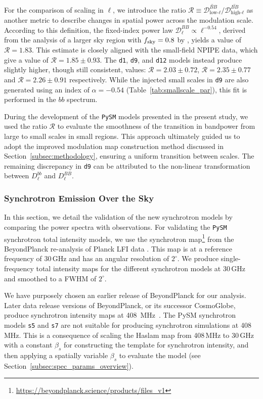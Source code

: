 \documentclass[twocolumn]{aastex631}
\begin{document}
For the comparison of scaling in $\ell$, we introduce the ratio $\mathcal{R} \equiv \overline{\mathcal{D}_{\text{low-}\ell}^{BB}} \Big/ \overline{\mathcal{D}_{\text{high-}\ell}^{BB}}$ as another metric to describe changes in spatial power across the modulation scale. According to this definition, the fixed-index power law $\mathcal{D}_\ell^{BB} \propto \ell^{-0.54}$, derived from the analysis of a larger sky region with $f_{\rm sky} = 0.8$ by \cite{planck2016-l11A}, yields a value of $\mathcal{R} = 1.83$. This estimate is closely aligned with the small-field NPIPE data, which give a value of $\mathcal{R} = 1.85 \pm 0.93$. The \texttt{d1}, \texttt{d9}, and \texttt{d12} models instead produce slightly higher, though still consistent, values: $\mathcal{R} = 2.03 \pm 0.72$, $\mathcal{R} = 2.35 \pm 0.77$ and $\mathcal{R} = 2.26 \pm 0.91$ respectively. While the injected small scales in \texttt{d9} are also generated using an index of $\alpha = -0.54$ (Table~\ref{tab:smallscale_par}), this fit is performed in the $bb$ spectrum. 

During the development of the \texttt{PySM} models presented in the present study, we used the ratio $\mathcal{R}$ to evaluate the smoothness of the transition in bandpower from large to small scales in small regions. This approach ultimately guided us to adopt the improved modulation map construction method discussed in Section~\ref{subsec:methodology}, ensuring a uniform transition between scales. The remaining discrepancy in \texttt{d9} can be attributed to the non-linear transformation between $D_\ell^{bb}$ and $D_\ell^{BB}$.

\subsubsection{Synchrotron Emission Over the Sky} \label{sec:sync_validation}

In this section, we detail the validation of the new synchrotron models by comparing the power spectra with observations. For validating the \texttt{PySM} synchrotron total intensity models, we use the synchrotron map\footnote{\url{https://beyondplanck.science/products/files\_v1}} from the BeyondPlanck re-analysis of Planck LFI data \citep{Andersen:2023}. This map is at a reference frequency of 30\,GHz and has an angular resolution of $2^\circ$. We produce single-frequency total intensity maps for the different synchrotron models at 30\,GHz and smoothed to a FWHM of $2^\circ$.

We have purposely chosen an earlier release of BeyondPlanck for our analysis. Later data release versions of BeyondPlanck, or its successor CosmoGlobe, produce synchrotron intensity maps at 408~MHz~\citep{Watts:2023b}. The PySM synchrotron models \texttt{s5} and \texttt{s7} are not suitable for producing synchrotron simulations at 408\,MHz. This is a consequence of scaling the Haslam map from 408\,MHz to 30\,GHz with a constant $\beta_s$ for constructing the template for synchrotron intensity, and then applying a spatially variable $\beta_s$ to evaluate the model (see Section~\ref{subsec:spec_params_overview}). 
\end{document}
